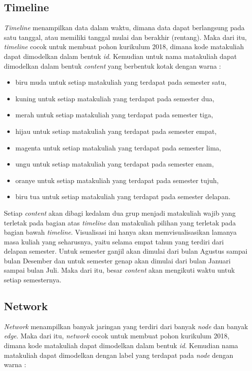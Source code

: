 \subsection{Timeline}
\textit{Timeline} menampilkan data dalam waktu, dimana data dapat berlangsung pada satu tanggal, atau memiliki tanggal mulai dan berakhir (rentang). Maka dari itu, \textit{timeline} cocok untuk membuat pohon kurikulum 2018, dimana kode matakuliah dapat dimodelkan dalam bentuk \textit{id}. Kemudian untuk nama matakuliah dapat dimodelkan dalam bentuk \textit{content} yang berbentuk kotak dengan warna :

\begin{itemize}
    \item biru muda untuk setiap matakuliah yang terdapat pada semester satu,
    \item kuning untuk setiap matakuliah yang terdapat pada semester dua,
    \item merah untuk setiap matakuliah yang terdapat pada semester tiga,
    \item hijau untuk setiap matakuliah yang terdapat pada semester empat,
    \item magenta untuk setiap matakuliah yang terdapat pada semester lima,
    \item ungu untuk setiap matakuliah yang terdapat pada semester enam,
    \item oranye untuk setiap matakuliah yang terdapat pada semester tujuh,
    \item biru tua untuk setiap matakuliah yang terdapat pada semester delapan.
\end{itemize}

Setiap \textit{content} akan dibagi kedalam dua grup menjadi matakuliah wajib yang terletak pada bagian atas \textit{timeline} dan matakuliah pilihan yang terletak pada bagian bawah \textit{timeline}. Visualisasi ini hanya akan memvisualisasikan lamanya masa kuliah yang seharusnya, yaitu selama empat tahun yang terdiri dari delapan semester. Untuk semester ganjil akan dimulai dari bulan Agustus sampai bulan Desember dan untuk semester genap akan dimulai dari bulan Januari sampai bulan Juli. Maka dari itu, besar \textit{content} akan mengikuti waktu untuk setiap semesternya.

\subsection{Network}
\textit{Network} menampilkan banyak jaringan yang terdiri dari banyak \textit{node} dan banyak \textit{edge}. Maka dari itu, \textit{network} cocok untuk membuat pohon kurikulum 2018, dimana kode matakuliah dapat dimodelkan dalam bentuk \textit{id}. Kemudian nama matakuliah dapat dimodelkan dengan label yang terdapat pada \textit{node} dengan warna :


